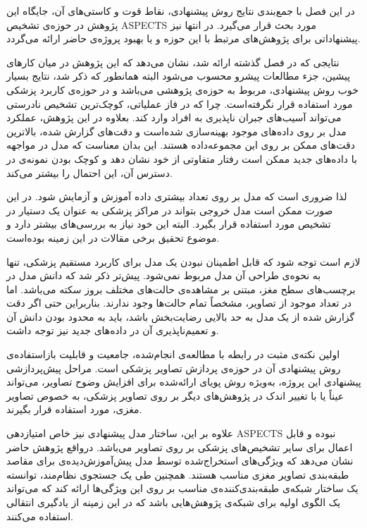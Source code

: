 

در این فصل با جمع‌بندی نتایج روش پیشنهادی، نقاط قوت و کاستی‌های آن، جایگاه این پژوهش در حوزه‌ی تشخیص ASPECTS 
مورد بحث قرار می‌گیرد.
در انتها نیز پیشنهاداتی برای پژوهش‌های مرتبط با این حوزه و یا بهبود پروژه‌ی حاضر ارائه می‌گردد. 



نتایجی که در فصل گذشته ارائه شد، نشان می‌دهد که این پژوهش در میان کارهای پیشین، جزء مطالعات پیشرو محسوب می‌شود
البته همانطور که ذکر شد، نتایج بسیار خوب روش پیشنهادی، مربوط به حوزه‌ی پژوهشی می‌باشد و در حوزه‌ی کاربرد پزشکی
مورد استفاده قرار نگرفته‌است.
چرا که در فاز عملیاتی، کوچک‌ترین تشخیص نادرستی می‌تواند آسیب‌های جبران ناپذیری به افراد وارد کند.
بعلاوه در این پژوهش، عملکرد مدل بر روی داده‌های موجود بهینه‌سازی شده‌است و دقت‌های گزارش شده، بالاترین دقت‌های ممکن بر روی این مجموعه‌داده هستند.
این بدان معناست که مدل در مواجهه با داده‌های جدید ممکن است رفتار متفاوتی از خود نشان دهد و کوچک بودن نمونه‌ی در دسترس آن، این احتمال را بیشتر می‌کند.

لذا ضروری است که مدل بر روی تعداد بیشتری داده آموزش و آزمایش شود.
در این صورت ممکن است مدل خروجی بتواند در مراکز پزشکی به عنوان یک دستیار در تشخیص مورد استفاده قرار بگیرد.
البته این خود نیاز به بررسی‌های بیشتر دارد و موضوع تحقیق برخی مقالات در این زمینه بوده‌است.

لازم است توجه شود که قابل اطمینان نبودن یک مدل برای کاربرد مستقیم پزشکی، تنها به نحوه‌ی طراحی آن مدل مربوط نمی‌شود.
پیش‌تر ذکر شد که دانش مدل در برچسب‌های سطح مغز، مبتنی بر مشاهده‌ی حالت‌های مختلف بروز سکته می‌باشد.
اما در تعداد موجود از تصاویر، مشخصاً تمام حالت‌ها وجود ندارند.
بناربراین حتی اگر دقت گزارش شده از یک مدل به حد بالایی رضایت‌بخش باشد، باید به محدود بودن دانش آن و 
تعمیم‌ناپذیری آن در داده‌های جدید نیز توجه داشت.


اولین نکته‌ی مثبت در رابطه با مطالعه‌ی انجام‌شده، 
جامعیت و قابلیت بازاستفاده‌ی روش پیشنهادی آن در حوزه‌ی پردازش تصاویر پزشکی است.
مراحل پیش‌پردازشی پیشنهادی این پروژه، به‌ویژه روش پویای ارائه‌شده برای افزایش وضوح تصاویر، می‌تواند عیناً یا با تغییر اندک در پژوهش‌های دیگر بر روی تصاویر پزشکی، به خصوص تصاویر مغزی،
مورد استفاده قرار بگیرند. 

علاوه بر این، 
ساختار مدل پیشنهادی نیز خاص امتیازدهی ASPECTS نبوده و قابل اعمال برای سایر تشخیص‌های پزشکی بر روی تصاویر می‌باشد.
درواقع پژوهش حاضر نشان می‌دهد که ویژگی‌های استخراج‌شده توسط مدل پیش‌آموزش‌دیده‌ی  برای مقاصد طبقه‌بندی تصاویر مغزی مناسب هستند.
همچنین طی یک جستجوی نظام‌مند، توانسته یک ساختار شبکه‌ی طبقه‌بندی‌کننده‌ی مناسب بر روی این ویژگی‌ها ارائه کند که می‌تواند یک الگوی اولیه برای شبکه‌ی پژوهش‌هایی باشد که در این زمینه از یادگیری انتقالی استفاده می‌کنند.

